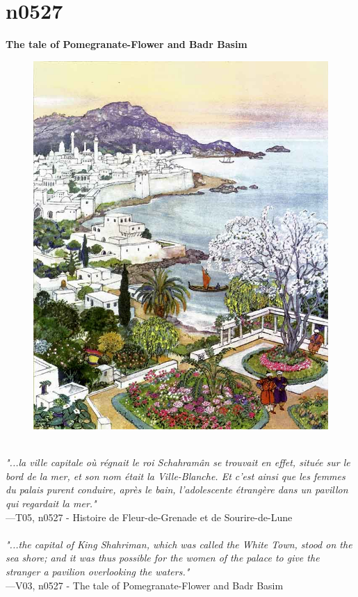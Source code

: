 \documentclass[../Carre_nights.tex]{subfiles}
\begin{document}
\newpage

\section{n0527}
\textbf{\Large{The tale of Pomegranate-Flower and Badr Basim}} \\

\begin{figure}[ht]
\centering
\includegraphics[height=\figsize]{illustrations/volume_5/T05, n0527 - Histoire de Fleur-de-Grenade et de Sourire-de-Lune.jpg}
\end{figure}

\textit{\\
"...la ville capitale où régnait le roi Schahramân se trouvait en effet, située sur le bord de la mer, et son nom était la Ville-Blanche. Et c’est ainsi que les femmes du palais purent conduire, après le bain, l’adolescente étrangère dans un pavillon qui regardait la mer."} \\
—T05, n0527 - Histoire de Fleur-de-Grenade et de Sourire-de-Lune \\~\\
\textit{"...the capital of King Shahriman, which was called the White Town, stood on the sea shore; and it was thus possible for the women of the palace to give the stranger a pavilion overlooking the waters."} \\
—V03, n0527 - The tale of Pomegranate-Flower and Badr Basim
\end{document}
